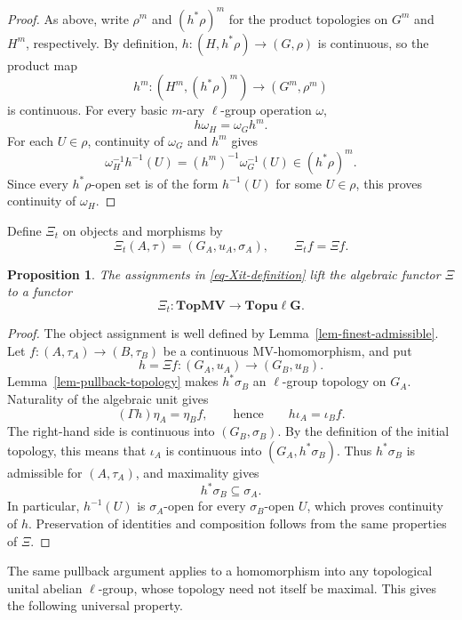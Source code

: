 \documentclass[preprint,3p]{elsarticle}
\theoremstyle{plain}
\newtheorem{prop}[thm]{Proposition}
\theoremstyle{definition}
\newcommand{\TopMV}{\mathbf{TopMV}}
\newcommand{\Topulg}{\mathbf{Topu\ell G}}
\numberwithin{equation}{section}
\begin{document}
\begin{proof}
As above, write $\rho^m$ and $(h^*\rho)^m$ for the product topologies on
$G^m$ and $H^m$, respectively.  By definition,
$h\colon(H,h^*\rho)\longrightarrow(G,\rho)$ is continuous, so the product
map
\[
 h^m\colon(H^m,(h^*\rho)^m)\longrightarrow(G^m,\rho^m)
\]
is continuous.
For every basic $m$-ary $\ell$-group operation $\omega$,
\[
 h\omega_H=\omega_Gh^m.
\]
For each $U\in\rho$, continuity of $\omega_G$ and $h^m$ gives
\[
 \omega_H^{-1}h^{-1}(U)
 =(h^m)^{-1}\omega_G^{-1}(U)
 \in(h^*\rho)^m.
\]
Since every $h^*\rho$-open set is of the form $h^{-1}(U)$ for some
$U\in\rho$, this proves continuity of $\omega_H$.
\end{proof}

Define $\Xi_t$ on objects and morphisms by
\begin{equation}
\label{eq-Xit-definition}
 \Xi_t(A,\tau)=(G_A,u_A,\sigma_A),\qquad \Xi_t f=\Xi f.
\end{equation}

\begin{prop}
\label{prop-Xit-functor}
The assignments in \eqref{eq-Xit-definition} lift the algebraic functor $\Xi$ to a functor
\[
 \Xi_t\colon\TopMV\longrightarrow\Topulg.
\]
\end{prop}

\begin{proof}
The object assignment is well defined by
Lemma~\ref{lem-finest-admissible}.  Let
$f\colon(A,\tau_A)\longrightarrow(B,\tau_B)$ be a continuous
MV-homomorphism, and put
\[
 h=\Xi f\colon(G_A,u_A)\longrightarrow(G_B,u_B).
\]
Lemma~\ref{lem-pullback-topology} makes $h^*\sigma_B$ an
$\ell$-group topology on $G_A$.  Naturality of the algebraic unit gives
\[
 (\Gamma h)\eta_A=\eta_Bf,
 \qquad\text{hence}\qquad h\iota_A=\iota_Bf.
\]
The right-hand side is continuous into $(G_B,\sigma_B)$.  By the
definition of the initial topology, this means that $\iota_A$ is
continuous into $(G_A,h^*\sigma_B)$.  Thus $h^*\sigma_B$ is admissible
for $(A,\tau_A)$, and maximality gives
\[
 h^*\sigma_B\subseteq\sigma_A.
\]
In particular, $h^{-1}(U)$ is $\sigma_A$-open for every
$\sigma_B$-open $U$, which proves continuity of $h$.
Preservation of identities and composition follows from the same
properties of $\Xi$.
\end{proof}

The same pullback argument applies to a homomorphism into any
topological unital abelian $\ell$-group, whose topology need not itself
be maximal.  This gives the following universal property.
\end{document}
